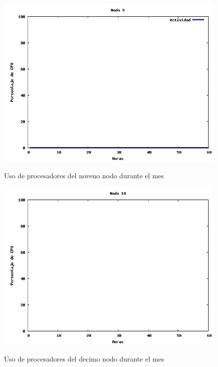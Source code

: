 \documentclass[11pt,a4paper,oneside,openany]{report}
\begin{document}
\begin{figure}[htb]
\centering
\includegraphics[width=0.9\linewidth]{grafico9.jpg}\\
\caption{Uso de procesadores del noveno nodo durante el mes}
\end{figure}

\begin{figure}[htb]
\centering
\includegraphics[width=0.9\linewidth]{grafico10.jpg}\\
\caption{Uso de procesadores del decimo nodo durante el mes}
\end{figure}
\end{document}
